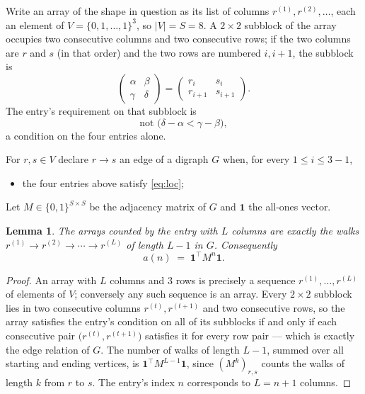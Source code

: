 \documentclass[11pt,a4paper]{article}
\theoremstyle{plain}
\newtheorem{lemma}[theorem]{Lemma}
\theoremstyle{definition}
\begin{document}
Write an array of the shape in question as its list of columns
$r^{(1)},r^{(2)},\dots$, each an element of
$V=\{0,1,\dots,1\}^{3}$, so $|V|=S=8$. A $2\times2$ subblock of the array
occupies two consecutive columns and two consecutive rows; if the two columns are $r$
and $s$ (in that order) and the two rows are numbered $i,i+1$,
the subblock is
\[
\begin{pmatrix}\alpha&\beta\\\gamma&\delta\end{pmatrix}=\begin{pmatrix}r_i&s_i\\r_{i+1}&s_{i+1}\end{pmatrix}.
\]
The entry's requirement on that subblock is
\begin{equation}\label{eq:loc}
\text{not }\bigl(\delta-\alpha<\gamma-\beta\bigr),
\end{equation}
a condition on the four entries alone.

For $r,s\in V$ declare $r\to s$ an edge of a digraph $G$ when, for every
$1\le i\le 3-1$,
\begin{itemize}
\item the four entries above satisfy \eqref{eq:loc};

\end{itemize}
Let $M\in\{0,1\}^{S\times S}$ be the adjacency matrix of $G$ and $\mathbf{1}$ the
all-ones vector.

\begin{lemma}\label{lem:walk}
The arrays counted by the entry with $L$ columns are exactly the walks
$r^{(1)}\to r^{(2)}\to\cdots\to r^{(L)}$ of length $L-1$ in $G$. Consequently
\[
a(n)\;=\;\mathbf{1}^{\!\top}M^{n}\mathbf{1} .
\]
\end{lemma}

\begin{proof}
An array with $L$ columns and $3$ rows is precisely a sequence
$r^{(1)},\dots,r^{(L)}$ of elements of $V$; conversely any such sequence is an array.
Every $2\times2$ subblock lies in two consecutive columns $r^{(t)},r^{(t+1)}$ and two
consecutive rows, so the array satisfies the entry's condition on all of its subblocks
if and only if each consecutive pair $\bigl(r^{(t)},r^{(t+1)}\bigr)$ satisfies it for
every row pair --- which is exactly the edge relation of $G$. The number of walks of
length $L-1$, summed over all starting and ending vertices, is
$\mathbf{1}^{\!\top}M^{L-1}\mathbf{1}$, since $(M^{k})_{r,s}$ counts the walks of
length $k$ from $r$ to $s$. The entry's index $n$ corresponds to $L=n+1$ columns.
\end{proof}
\end{document}
